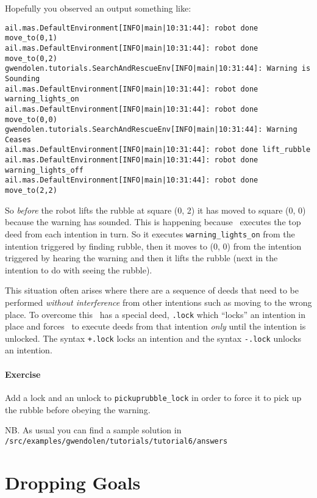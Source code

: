 \documentclass[a4]{article}
\begin{document}
Hopefully you observed an output something like:
\begin{verbatim}
ail.mas.DefaultEnvironment[INFO|main|10:31:44]: robot done move_to(0,1) 
ail.mas.DefaultEnvironment[INFO|main|10:31:44]: robot done move_to(0,2) 
gwendolen.tutorials.SearchAndRescueEnv[INFO|main|10:31:44]: Warning is Sounding 
ail.mas.DefaultEnvironment[INFO|main|10:31:44]: robot done warning_lights_on 
ail.mas.DefaultEnvironment[INFO|main|10:31:44]: robot done move_to(0,0) 
gwendolen.tutorials.SearchAndRescueEnv[INFO|main|10:31:44]: Warning Ceases 
ail.mas.DefaultEnvironment[INFO|main|10:31:44]: robot done lift_rubble 
ail.mas.DefaultEnvironment[INFO|main|10:31:44]: robot done warning_lights_off 
ail.mas.DefaultEnvironment[INFO|main|10:31:44]: robot done move_to(2,2) 
\end{verbatim}
So \emph{before} the robot lifts the rubble at square (0, 2) it has moved to square (0, 0) because the warning has sounded.  This is happening because \gwendolen\ executes the top deed from each intention in turn.  So it executes \lstinline{warning_lights_on} from the intention triggered by finding rubble, then it moves to (0, 0) from the intention triggered by hearing the warning and then it lifts the rubble (next in the intention to do with seeing the rubble).

This situation often arises where there are a sequence of deeds that need to be performed \emph{without interference} from other intentions such as moving to the wrong place.  To overcome this \gwendolen\ has a special deed, \lstinline{.lock} which ``locks'' an intention in place and forces \gwendolen\ to execute deeds from that intention \emph{only} until the intention is unlocked.  The syntax \lstinline{+.lock} locks an intention and the syntax \lstinline{-.lock} unlocks an intention.

\paragraph{Exercise} Add a lock and an unlock to \verb+pickuprubble_lock+ in order to force it to pick up the rubble before obeying the warning.

\begin{sloppypar}
NB. As usual you can find a sample solution in \texttt{/src/examples/gwendolen/tutorials/tutorial6/answers}
\end{sloppypar}

\section{Dropping Goals}
\end{document}
